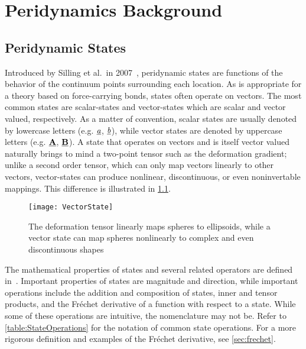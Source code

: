 \chapter{Peridynamics Background}
\label{ch:PDBackground}

\section{Peridynamic States}
%
Introduced by Silling et al.\ in 2007~\cite{silling2007peridynamic}, peridynamic states are functions of the behavior of the continuum points surrounding each location.
As is appropriate for a theory based on force-carrying bonds, states often operate on vectors.
The most common states are scalar-states and vector-states which are scalar and vector valued, respectively.
As a matter of convention, scalar states are usually denoted by lowercase letters (e.g. $\sstate{a}{}{}$, $\sstate{b}{}{}$), while vector states are denoted by uppercase letters (e.g. $\vstate{A}{}{}$, $\vstate{B}{}{}$).
A state that operates on vectors and is itself vector valued naturally brings to mind a two-point tensor such as the deformation gradient;
unlike a second order tensor, which can only map vectors linearly to other vectors, vector-states can produce nonlinear, discontinuous, or even noninvertable mappings.  
This difference is illustrated in \cref{fig:VectorState}.
%
\begin{figure}[h]
  \centering
\texttt{[image: VectorState]}
\caption[Deformation tensor vs. deformation vector state]{The deformation tensor linearly maps spheres to ellipsoids, while a vector state can map spheres nonlinearly to complex and even discontinuous shapes \cite{silling2007peridynamic}}
\label{fig:VectorState}
\end{figure}
%

The mathematical properties of states and several related operators are defined in~\cite{silling2007peridynamic}.
Important properties of states are magnitude and direction, while important operations include the addition and composition of states, inner and tensor products, and the Fr\'{e}chet derivative of a function with respect to a state.
While some of these operations are intuitive, the nomenclature may not be.
Refer to \cref{table:StateOperations} for the notation of common state operations.
For a more rigorous definition and examples of the Fr\'echet derivative, see \cref{sec:frechet}.

